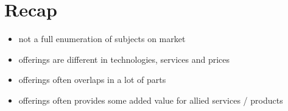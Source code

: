\documentclass[presentation]{beamer}
\begin{document}
\section*{Recap}
\label{sec:orga36597a}
\begin{itemize}
\item not a full enumeration of subjects on market
\item offerings are different in technologies, services and prices
\item offerings often overlaps in a lot of parts
\item offerings often provides some added value for allied services / products
\end{itemize}
\end{document}
